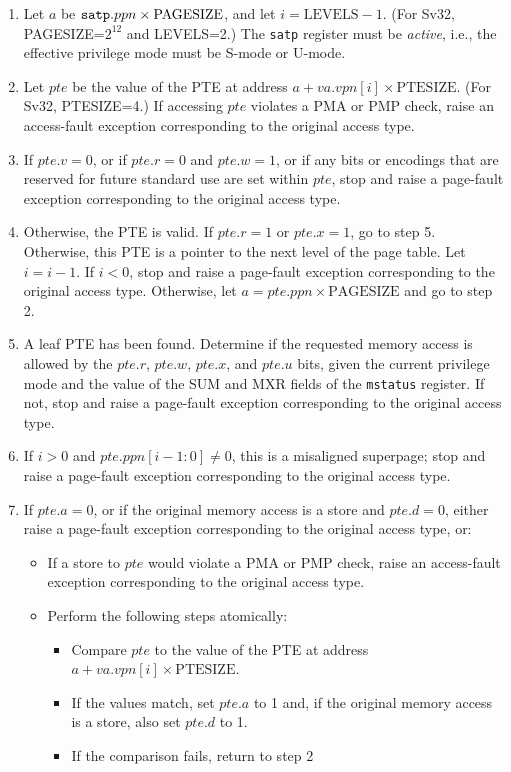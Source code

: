 \begin{enumerate}

\item Let $a$ be ${\tt satp}.ppn \times \textrm{PAGESIZE}$, and let $i=\textrm{LEVELS} - 1$. (For Sv32, PAGESIZE=$2^{12}$ and LEVELS=2.)
  The {\tt satp} register must be {\em active}, i.e., the effective privilege
  mode must be S-mode or U-mode.

\item Let $pte$ be the value of the PTE at address
  $a+va.vpn[i]\times \textrm{PTESIZE}$. (For Sv32, PTESIZE=4.)
  If accessing $pte$ violates a PMA or PMP check, raise an
  access-fault exception corresponding to the original access type.

\item If $pte.v=0$, or if $pte.r=0$ and $pte.w=1$, or if any bits or encodings
  that are reserved for future standard use are set within $pte$, stop and
  raise a page-fault exception corresponding to the original access type.

\item Otherwise, the PTE is valid.
  If $pte.r=1$ or $pte.x=1$, go to step 5.
  Otherwise, this PTE is a pointer to the next level of the page table.  Let
  $i=i-1$.  If $i<0$, stop and raise a page-fault exception
  corresponding to the original access type.  Otherwise, let
  $a=pte.ppn \times \textrm{PAGESIZE}$ and go to step 2.

\item A leaf PTE has been found.  Determine if the requested memory access is
  allowed by the $pte.r$, $pte.w$, $pte.x$, and $pte.u$ bits, given the
  current privilege mode and the value of the SUM and MXR fields of
  the {\tt mstatus} register.  If not, stop and raise a page-fault
  exception corresponding to the original access type.

\item If $i>0$ and $pte.ppn[i-1:0]\neq 0$, this is a misaligned superpage;
  stop and raise a page-fault exception corresponding to the original access type.

\item If $pte.a=0$, or if the original memory access is a store and $pte.d=0$, either
  raise a page-fault exception corresponding to the original access type, or:
  \begin{itemize}
  \item If a store to $pte$ would violate a PMA or PMP check, raise an
    access-fault exception corresponding to the original access type.
  \item Perform the following steps atomically:
    \begin{itemize}
      \item Compare $pte$ to the value of the PTE at address $a+va.vpn[i]\times \textrm{PTESIZE}$.
      \item If the values match, set $pte.a$ to 1 and, if the original memory
        access is a store, also set $pte.d$ to 1.
      \item If the comparison fails, return to step 2
    \end{itemize}
  \end{itemize}


\end{enumerate}
